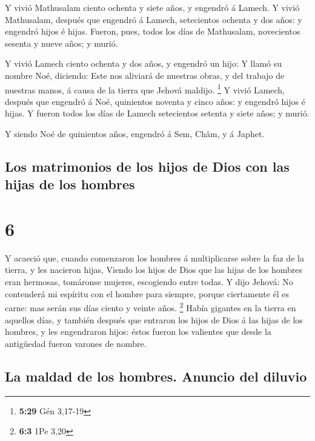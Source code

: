  Y vivió Mathusalam ciento ochenta y siete años, y engendró
á Lamech.  Y vivió Mathusalam, después que engendró á
Lamech, setecientos ochenta y dos años: y engendró hijos é hijas.
 Fueron, pues, todos los días de Mathusalam, novecientos
sesenta y nueve años; y murió.

 Y vivió Lamech ciento ochenta y dos años, y engendró un
hijo:  Y llamó su nombre Noé, diciendo: Este nos aliviará
de nuestras obras, y del trabajo de nuestras manos, á causa de la tierra
que Jehová maldijo. \footnote{\textbf{5:29} Gén 3,17-19}  Y
vivió Lamech, después que engendró á Noé, quinientos noventa y cinco
años: y engendró hijos é hijas.  Y fueron todos los días de
Lamech setecientos setenta y siete años; y murió.

 Y siendo Noé de quinientos años, engendró á Sem, Châm, y á
Japhet.

\hypertarget{los-matrimonios-de-los-hijos-de-dios-con-las-hijas-de-los-hombres}{%
\subsection{Los matrimonios de los hijos de Dios con las hijas de los
hombres}\label{los-matrimonios-de-los-hijos-de-dios-con-las-hijas-de-los-hombres}}

\hypertarget{section-5}{%
\section{6}\label{section-5}}

 Y acaeció que, cuando comenzaron los hombres á
multiplicarse sobre la faz de la tierra, y les nacieron hijas,
 Viendo los hijos de Dios que las hijas de los hombres eran
hermosas, tomáronse mujeres, escogiendo entre todas.  Y dijo
Jehová: No contenderá mi espíritu con el hombre para siempre, porque
ciertamente él es carne: mas serán sus días ciento y veinte años.
\footnote{\textbf{6:3} 1Pe 3,20}  Había gigantes en la
tierra en aquellos días, y también después que entraron los hijos de
Dios á las hijas de los hombres, y les engendraron hijos: éstos fueron
los valientes que desde la antigüedad fueron varones de nombre.

\hypertarget{la-maldad-de-los-hombres.-anuncio-del-diluvio}{%
\subsection{La maldad de los hombres. Anuncio del
diluvio}\label{la-maldad-de-los-hombres.-anuncio-del-diluvio}}

